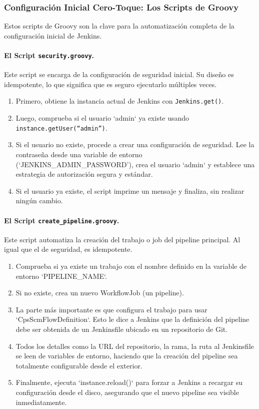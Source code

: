 \subsubsection{Configuración Inicial Cero-Toque: Los Scripts de Groovy}
\label{subsubsec:groovy_exhaustivo}

Estos scripts de Groovy son la clave para la automatización completa de la configuración inicial de Jenkins.

\paragraph{El Script \texttt{security.groovy}.}
Este script se encarga de la configuración de seguridad inicial. Su diseño es idempotente, lo que significa que es seguro ejecutarlo múltiples veces.
\begin{enumerate}
    \item Primero, obtiene la instancia actual de Jenkins con \texttt{Jenkins.get()}.
    \item Luego, comprueba si el usuario `admin` ya existe usando \texttt{instance.getUser(``admin'')}.
    \item Si el usuario no existe, procede a crear una configuración de seguridad. Lee la contraseña desde una variable de entorno (`JENKINS\_ADMIN\_PASSWORD'), crea el usuario `admin` y establece una estrategia de autorización segura y estándar.
    \item Si el usuario ya existe, el script imprime un mensaje y finaliza, sin realizar ningún cambio.
\end{enumerate}

\paragraph{El Script \texttt{create\_pipeline.groovy}.}
Este script automatiza la creación del trabajo o job del pipeline principal. Al igual que el de seguridad, es idempotente.
\begin{enumerate}
    \item Comprueba si ya existe un trabajo con el nombre definido en la variable de entorno `PIPELINE\_NAME`.
    \item Si no existe, crea un nuevo WorkflowJob (un pipeline).
    \item La parte más importante es que configura el trabajo para usar `CpsScmFlowDefinition`. Esto le dice a Jenkins que la definición del pipeline debe ser obtenida de un Jenkinsfile ubicado en un repositorio de Git.
    \item Todos los detalles como la URL del repositorio, la rama, la ruta al Jenkinsfile se leen de variables de entorno, haciendo que la creación del pipeline sea totalmente configurable desde el exterior.
    \item Finalmente, ejecuta `instance.reload()` para forzar a Jenkins a recargar su configuración desde el disco, asegurando que el nuevo pipeline sea visible inmediatamente.
\end{enumerate}

